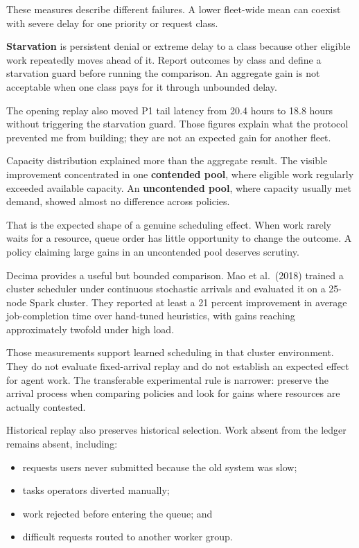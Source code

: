 These measures describe different failures. A lower fleet-wide mean can coexist with severe delay for one priority or request class.

\textbf{Starvation} is persistent denial or extreme delay to a class because other eligible work repeatedly moves ahead of it. Report outcomes by class and define a starvation guard before running the comparison. An aggregate gain is not acceptable when one class pays for it through unbounded delay.

The opening replay also moved P1 tail latency from 20.4 hours to 18.8 hours without triggering the starvation guard. Those figures explain what the protocol prevented me from building; they are not an expected gain for another fleet.

Capacity distribution explained more than the aggregate result. The visible improvement concentrated in one \textbf{contended pool}, where eligible work regularly exceeded available capacity. An \textbf{uncontended pool}, where capacity usually met demand, showed almost no difference across policies.

That is the expected shape of a genuine scheduling effect. When work rarely waits for a resource, queue order has little opportunity to change the outcome. A policy claiming large gains in an uncontended pool deserves scrutiny.

Decima provides a useful but bounded comparison. Mao et al.~(2018) trained a cluster scheduler under continuous stochastic arrivals and evaluated it on a 25-node Spark cluster. They reported at least a 21 percent improvement in average job-completion time over hand-tuned heuristics, with gains reaching approximately twofold under high load.

Those measurements support learned scheduling in that cluster environment. They do not evaluate fixed-arrival replay and do not establish an expected effect for agent work. The transferable experimental rule is narrower: preserve the arrival process when comparing policies and look for gains where resources are actually contested.


Historical replay also preserves historical selection. Work absent from the ledger remains absent, including:

\begin{itemize}
\tightlist
\item
  requests users never submitted because the old system was slow;
\item
  tasks operators diverted manually;
\item
  work rejected before entering the queue; and
\item
  difficult requests routed to another worker group.
\end{itemize}

